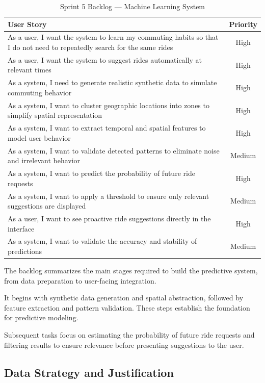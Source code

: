 \begin{table}[!htbp]
\centering
\renewcommand{\arraystretch}{1.4}
\setlength{\tabcolsep}{6pt}
\begin{tabular}{|p{10cm}|c|}
\hline
\textbf{User Story} & \textbf{Priority} \\
\hline
As a user, I want the system to learn my commuting habits so that I do not need to repeatedly search for the same rides & High \\
\hline
As a user, I want the system to suggest rides automatically at relevant times & High \\
\hline
As a system, I need to generate realistic synthetic data to simulate commuting behavior & High \\
\hline
As a system, I want to cluster geographic locations into zones to simplify spatial representation & High \\
\hline
As a system, I want to extract temporal and spatial features to model user behavior & High \\
\hline
As a system, I want to validate detected patterns to eliminate noise and irrelevant behavior & Medium \\
\hline
As a system, I want to predict the probability of future ride requests & High \\
\hline
As a system, I want to apply a threshold to ensure only relevant suggestions are displayed & Medium \\
\hline
As a user, I want to see proactive ride suggestions directly in the interface & High \\
\hline
As a system, I want to validate the accuracy and stability of predictions & Medium \\
\hline
\end{tabular}
\caption{Sprint 5 Backlog — Machine Learning System}
\end{table}

The backlog summarizes the main stages required to build the predictive system, from data preparation to user-facing integration.

It begins with synthetic data generation and spatial abstraction, followed by feature extraction and pattern validation. These steps establish the foundation for predictive modeling.

Subsequent tasks focus on estimating the probability of future ride requests and filtering results to ensure relevance before presenting suggestions to the user.

\subsection{Data Strategy and Justification}

